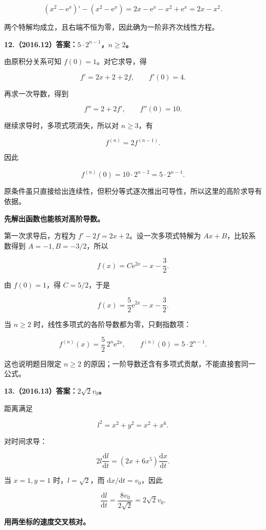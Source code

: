 \documentclass[UTF8,11pt,fontset=windows]{ctexart}
\begin{document}
$$
(x^2-\mathrm e^x)'-(x^2-\mathrm e^x)
=2x-\mathrm e^x-x^2+\mathrm e^x=2x-x^2.
$$

两个特解均成立，且右端不恒为零，因此确为一阶非齐次线性方程。

\clearpage

\textbf{12.（2016.12）答案：$5\cdot2^{n-1}$，$n\ge2$。}

由原积分关系可知 $f(0)=1$。对它求导，得

$$
f'=2x+2+2f,
\qquad f'(0)=4.
$$

再求一次导数，得到

$$
f''=2+2f',
\qquad f''(0)=10.
$$

继续求导时，多项式项消失，所以对 $n\ge3$，有

$$
f^{(n)}=2f^{(n-1)}.
$$

因此

$$
f^{(n)}(0)=10\cdot2^{n-2}=5\cdot2^{n-1}.
$$

原条件虽只直接给出连续性，但积分等式逐次推出可导性，所以这里的高阶求导有依据。

\textbf{先解出函数也能核对高阶导数。}

第一次求导后，方程为 $f'-2f=2x+2$。设一次多项式特解为 $Ax+B$，比较系数得到 $A=-1,B=-3/2$，所以

$$
f(x)=C\mathrm e^{2x}-x-\frac32.
$$

由 $f(0)=1$，得 $C=5/2$，于是

$$
f(x)=\frac52\mathrm e^{2x}-x-\frac32.
$$

当 $n\ge2$ 时，线性多项式的各阶导数都为零，只剩指数项：

$$
f^{(n)}(x)=\frac52\,2^n\mathrm e^{2x},
\qquad f^{(n)}(0)=5\cdot2^{n-1}.
$$

这也说明题目限定 $n\ge2$ 的原因；一阶导数还含有多项式贡献，不能直接套同一公式。

\clearpage

\textbf{13.（2016.13）答案：$2\sqrt2v_0$。}

距离满足

$$
l^2=x^2+y^2=x^2+x^6.
$$

对时间求导：

$$
2l\frac{\mathrm dl}{\mathrm dt}
=(2x+6x^5)\frac{\mathrm dx}{\mathrm dt}.
$$

当 $x=1,y=1$ 时，$l=\sqrt2$，而 $\mathrm dx/\mathrm dt=v_0$，因此

$$
\frac{\mathrm dl}{\mathrm dt}=
\frac{8v_0}{2\sqrt2}=2\sqrt2v_0.
$$

\textbf{用两坐标的速度交叉核对。}
\end{document}
